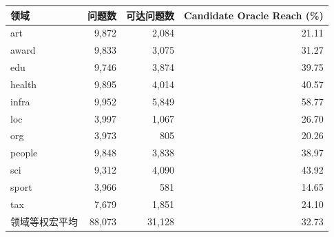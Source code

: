 \begin{tabular}{lrrr}
\toprule
领域 & 问题数 & 可达问题数 & Candidate Oracle Reach (\%) \\
\midrule
art & 9,872 & 2,084 & 21.11 \\
award & 9,833 & 3,075 & 31.27 \\
edu & 9,746 & 3,874 & 39.75 \\
health & 9,895 & 4,014 & 40.57 \\
infra & 9,952 & 5,849 & 58.77 \\
loc & 3,997 & 1,067 & 26.70 \\
org & 3,973 & 805 & 20.26 \\
people & 9,848 & 3,838 & 38.97 \\
sci & 9,312 & 4,090 & 43.92 \\
sport & 3,966 & 581 & 14.65 \\
tax & 7,679 & 1,851 & 24.10 \\
\midrule
领域等权宏平均 & 88,073 & 31,128 & 32.73 \\
\bottomrule
\end{tabular}
